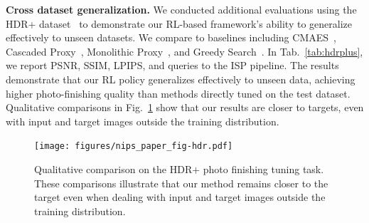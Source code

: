 \documentclass{article}
\begin{document}
\noindent\textbf{Cross dataset generalization.}
We conducted additional evaluations using the HDR+ dataset~\cite{hdrplus} to demonstrate our RL-based framework's ability to generalize effectively to unseen datasets. We compare to baselines including CMAES~\cite{hansen2006cma, mosleh2020hardware}, Cascaded Proxy~\cite{tseng2022neural}, Monolithic Proxy~\cite{tseng2019hyperparameter}, and Greedy Search~\cite{Kim2023LearningCI}. In Tab.~\ref{tab:hdrplus}, we report PSNR, SSIM, LPIPS, and queries to the ISP pipeline. 
The results demonstrate that our RL policy generalizes effectively to unseen data, achieving higher photo-finishing quality than methods directly tuned on the test dataset. Qualitative comparisons in Fig.~\ref{fig:hdrp_vis1} show that our results are closer to targets, even with input and target images outside the training distribution.

\begin{figure}[t]
    \centering
    \texttt{[image: figures/nips\_paper\_fig-hdr.pdf]}
    \vspace{-0.2cm}
    \caption{Qualitative comparison on the HDR$+$ photo finishing tuning task. These comparisons illustrate that our method remains closer to the target even when dealing with input and target images outside the training distribution. \vspace{-8pt}}
    \label{fig:hdrp_vis1}
\end{figure}
\end{document}
